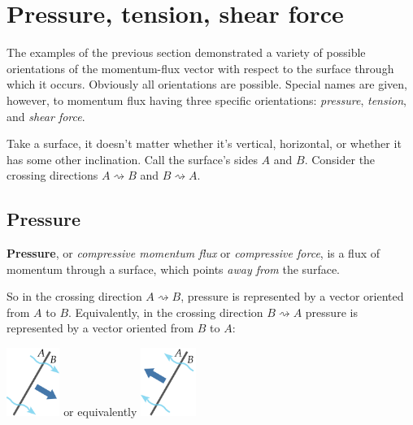 \documentclass[a4paper,12pt,%
onecolumn,oneside,%
british%
]{memoir}
\providecommand{\href}[2]{#2}
\renewcommand*{\|}[1][]{\nonscript\:#1\vert\nonscript\:\mathopen{}}
\newcommand*{\furl}[2]{\href{#1}{#2}\pagenote{\url{#1}}}
\begin{document}
\section{Pressure, tension, shear force}
\label{sec:pressure_tension_shear}

The examples of the previous section demonstrated a variety of possible orientations of the momentum-flux vector with respect to the surface through which it occurs. Obviously all orientations are possible. Special names are given, however, to momentum flux having three specific orientations: \emph{pressure}, \emph{tension}, and \emph{shear force}.

Take a surface, it doesn't matter whether it's vertical, horizontal, or whether it has some other inclination. Call the surface's sides $A$ and $B$. Consider the crossing directions $A\!\rightsquigarrow\!B$ and $B\!\rightsquigarrow\!A$.

\subsection{Pressure}
\label{sec:pressure}

\textbf{Pressure}, or \emph{compressive momentum flux} or \emph{compressive force}, is a flux of momentum through a surface, which points \emph{away from} the surface.

So in the crossing direction $A\!\rightsquigarrow\!B$, pressure is represented by a vector oriented from $A$ to $B$. Equivalently, in the crossing direction $B\!\rightsquigarrow\!A$ pressure is represented by a vector oriented from $B$ to $A$:\noprelistbreak
\begin{center}\medskip
  \hspace*{\fill}
  \includegraphics[align=c,height=6em]{images/pressure_right.pdf}
  \hfill{\small or equivalently}\hfill
  \includegraphics[align=c,height=6em]{images/pressure_left.pdf}
  \hspace*{\fill}
\end{center}
\end{document}
